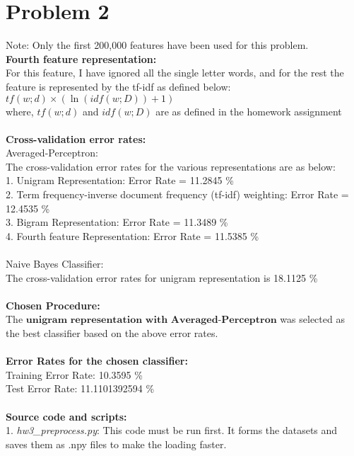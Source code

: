 \documentclass[fleqn]{article}
\begin{document}
\section{Problem 2}{}
	Note: Only the first 200,000 features have been used for this problem.\\
	\textbf{Fourth feature representation:} \\
	For this feature, I have ignored all the single letter words, and for the rest the feature is represented by the tf-idf as defined below: \\
		$tf(w; d) \times (\ln(idf(w;D)) + 1)$ \\
	where, $tf(w;d)$ and $idf(w;D)$ are as defined in the homework assignment \\
	\\
	\textbf{Cross-validation error rates:}\\
	Averaged-Perceptron:\\
	The cross-validation error rates for the various representations are as below:\\
	1. Unigram Representation: Error Rate = 11.2845 \% \\
	2. Term frequency-inverse document frequency (tf-idf) weighting: Error Rate = 12.4535 \% \\
	3. Bigram Representation: Error Rate = 11.3489 \% \\
	4. Fourth feature Representation: Error Rate = 11.5385 \% \\
	\\
	Naive Bayes Classifier:\\
	The cross-validation error rates for unigram representation is 18.1125 \% \\
	\\
	\textbf{Chosen Procedure:}\\
	The $\textbf{unigram representation with Averaged-Perceptron}$ was selected as the best classifier based on the above error rates.\\
	\\
	\textbf{Error Rates for the chosen classifier:}\\
	Training Error Rate: 10.3595 \%\\
	Test Error Rate: 11.1101392594 \%\\
	\\
	\textbf{Source code and scripts:}\\
	1. \textit{hw3\_preprocess.py}: This code must be run first. It forms the datasets and saves them as .npy files to make the loading faster.\\
\end{document}
